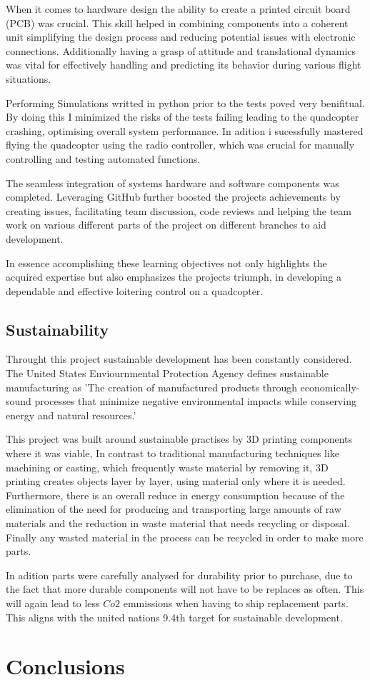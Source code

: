\documentclass{report}
\begin{document}
When it comes to hardware design the ability to create a printed circuit board
(PCB) was crucial. This skill helped in combining components into a coherent
unit simplifying the design process and reducing potential issues with
electronic connections. Additionally having a grasp of attitude and
translational dynamics was vital for effectively handling and predicting its
behavior during various flight situations.

Performing Simulations writted in python prior to the tests poved very
benifitual. By doing this I minimized the risks of the tests failing leading to
the quadcopter crashing, optimising overall system performance. In adition i
sucessfully mastered flying the quadcopter using the radio controller, which was
crucial for manually controlling and testing automated functions.

The seamless integration of systems hardware and software components was
completed. Leveraging GitHub further boosted the projects achievements by
creating issues, facilitating team discussion, code reviews and helping the team
work on various different parts of the project on different branches to aid
development.

In essence accomplishing these learning objectives not only highlights the
acquired expertise but also emphasizes the projects triumph, in developing a
dependable and effective loitering control on a quadcopter.

\section{Sustainability}
Throught this project sustainable development has been constantly considered. The United States Enviournmental Protection Agency defines sustainable manufacturing as 'The creation of manufactured products through economically-sound processes that minimize negative environmental impacts while conserving energy and natural resources.'\cite{sustainability}

This project was built around sustainable practises by 3D printing components where it was viable, In contrast to traditional manufacturing techniques like machining or casting, which frequently waste material by removing it, 3D printing creates objects layer by layer, using material only where it is needed. Furthermore, there is an overall reduce in energy consumption because of the elimination of the need for producing and transporting large amounts of raw materials and the reduction in waste material that needs recycling or disposal. Finally any wasted material in the process can be recycled in order to make more parts.

In adition parts were carefully analysed for durability prior to purchase, due to the fact that more durable components will not have to be replaces as often. This will again lead to less \(Co2\) emmissions when having to ship replacement parts. This aligns with the united nations 9.4th target for sustainable development. \cite{un}

\chapter{Conclusions}



\end{document}

